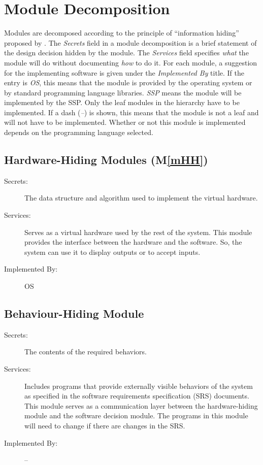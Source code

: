 \documentclass[12pt]{article}
\newcommand{\progname}{SSP}
\newcommand{\mref}[1]{M\ref{#1}}
\begin{document}
\section{Module Decomposition} \label{SecMD}

\hspace{3ex}Modules are decomposed according to the principle of
``information hiding'' proposed by \citet{ParnasEtAl1984}. The
\emph{Secrets} field in a module decomposition is a brief statement of
the design decision hidden by the module. The \emph{Services} field
specifies \emph{what} the module will do without documenting
\emph{how} to do it. For each module, a suggestion for the
implementing software is given under the \emph{Implemented By}
title. If the entry is \emph{OS}, this means that the module is
provided by the operating system or by standard programming language
libraries. \emph{\progname} means the module will be implemented by
the \progname. Only the leaf modules in the hierarchy have
to be implemented. If a dash (\emph{--}) is shown, this means that the
module is not a leaf and will not have to be implemented. Whether or
not this module is implemented depends on the programming language
selected.

\subsection{Hardware-Hiding Modules (\mref{mHH})}

\begin{description}
\item[Secrets:]The data structure and algorithm used to implement the
  virtual hardware.
\item[Services:]Serves as a virtual hardware used by the rest of the
  system. This module provides the interface between the hardware and
  the software. So, the system can use it to display outputs or to
  accept inputs.
\item[Implemented By:] OS
\end{description}

\subsection{Behaviour-Hiding Module}

\begin{description}
\item[Secrets:]The contents of the required behaviors.
\item[Services:]Includes programs that provide externally visible
  behaviors of the system as specified in the software requirements
  specification (SRS) documents. This module serves as a communication
  layer between the hardware-hiding module and the software decision
  module. The programs in this module will need to change if there are
  changes in the SRS.
\item[Implemented By:] --
\end{description}
\end{document}
